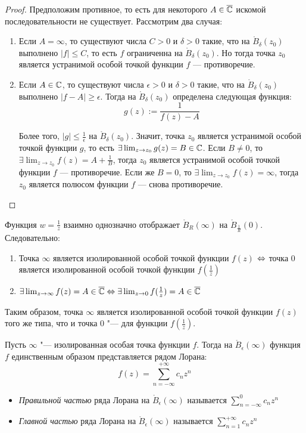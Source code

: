 \begin{proof}
	Предположим противное, то есть для некоторого $A \in \overline{\mathbb{C}}$ искомой последовательности не существует. Рассмотрим два случая:
	\begin{enumerate}
		\item Если $A = \infty$, то существуют числа $C > 0$ и $\delta > 0$ такие, что на $\mathring B_\delta(z_0)$ выполнено $|f| \le C$, то есть $f$ ограниченна на $\mathring B_\delta(z_0)$. Но тогда точка $z_0$ является устранимой особой точкой функции $f$ --- противоречие.
		
		\item Если $A \in \mathbb{C}$, то существуют числа $\epsilon > 0$ и $\delta > 0$ такие, что на $\mathring B_\delta(z_0)$ выполнено $|f - A| \ge \epsilon$. Тогда на $\mathring B_\delta(z_0)$ определена следующая функция:
		\[g(z) := \frac{1}{f(z) - A}\]
		
		Более того, $|g| \le \frac1\epsilon$ на $\mathring B_\delta(z_0)$. Значит, точка $z_0$ является устранимой особой точкой функции $g$, то есть $\exists \lim_{z \to z_0} g(z) = B \in \mathbb{C}$. Если $B \ne 0$, то $\exists \lim_{z \to z_0} f(z) = A + \frac1B$, тогда $z_0$ является устранимой особой точкой функции $f$ --- противоречие. Если же $B = 0$, то $\exists \lim_{z \to z_0} f(z) = \infty$, тогда $z_0$ является полюсом функции $f$ --- снова противоречие.\qedhere
	\end{enumerate}
\end{proof}

\begin{note}
	Функция $w = \frac1z$ взаимно однозначно отображает $\mathring B_R(\infty)$ на $\mathring B_{\frac1R}(0)$. Следовательно:
	\begin{enumerate}
		\item Точка $\infty$ является изолированной особой точкой функции $f(z)$ $\Leftrightarrow$ точка $0$ является изолированной особой точкой функции $f(\frac1z)$
		\item $\exists \lim_{z \to \infty}f(z) = A \in \overline{\mathbb{C}} \Leftrightarrow \exists \lim_{z \to 0}f(\frac1z) = A \in \overline{\mathbb{C}}$
	\end{enumerate}
	
	Таким образом, точка $\infty$ является изолированной особой точкой функции $f(z)$ того же типа, что и точка $0$ "--- для функции $f(\frac1z)$.
\end{note}

\begin{definition}
	Пусть $\infty$ "--- изолированная особая точка функции $f$. Тогда на $\mathring B_\epsilon(\infty)$ функция $f$ единственным образом представляется рядом Лорана:
	\[f(z) = \sum_{n = -\infty}^{+\infty}c_nz^n\]
	\begin{itemize}
		\item \textit{Правильной частью} ряда Лорана на $\mathring B_\epsilon(\infty)$ называется $\sum_{n = -\infty}^{0}c_nz^n$
		\item \textit{Главной частью} ряда Лорана на $\mathring B_\epsilon(\infty)$ называется $\sum_{n = 1}^{+\infty}c_nz^n$
	\end{itemize}
\end{definition}

